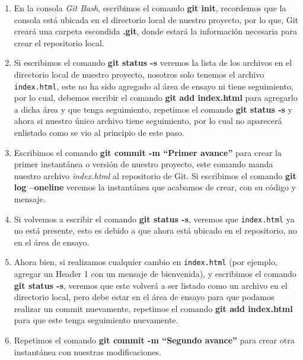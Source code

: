 \begin{enumerate}
    \item En la consola \textit{Git Bash}, escribimos el comando \textbf{git init}, recordemos que la consola está ubicada en el directorio local de nuestro proyecto, por lo que, Git creará una carpeta escondida \textbf{.git}, donde estará la información necesaria para crear el repositorio local.
    \item Si escribimos el comando \textbf{git status -s} veremos la lista de los archivos en el directorio local de nuestro proyecto, nosotros solo tenemos el archivo \texttt{index.html}, este no ha sido agregado al área de ensayo ni tiene seguimiento, por lo cual, debemos escribir el comando \textbf{git add index.html} para agregarlo a dicha área y que tenga seguimiento, repetimos el comando \textbf{git status -s} y ahora si nuestro único archivo tiene seguimiento, por lo cual no aparecerá enlistado como se vio al principio de este paso.
    \item Escribimos el comando \textbf{git commit -m “Primer avance”} para crear la primer instantánea o versión de nuestro proyecto, este comando manda nuestro archivo \textit{index.html} al repositorio de Git. Si escribimos el comando \textbf{git log –oneline} veremos la instantánea que acabamos de crear, con su código y mensaje.
    \item Si volvemos a escribir el comando \textbf{git status -s}, veremos que \texttt{index.html} ya no está presente, esto es debido a que ahora está ubicado en el repositorio, no en el área de ensayo.
    \item Ahora bien, si realizamos cualquier cambio en \texttt{index.html} (por ejemplo, agregar un Header 1 con un mensaje de bienvenida), y escribimos el comando \textbf{git status -s}, veremos que este volverá a ser listado como un archivo en el directorio local, pero debe estar en el área de ensayo para que podamos realizar un commit nuevamente, repetimos el comando \textbf{git add index.html} para que este tenga seguimiento nuevamente.
    \item Repetimos el comando \textbf{git commit -m “Segundo avance”} para crear otra instantánea con nuestras modificaciones.

\end{enumerate}
